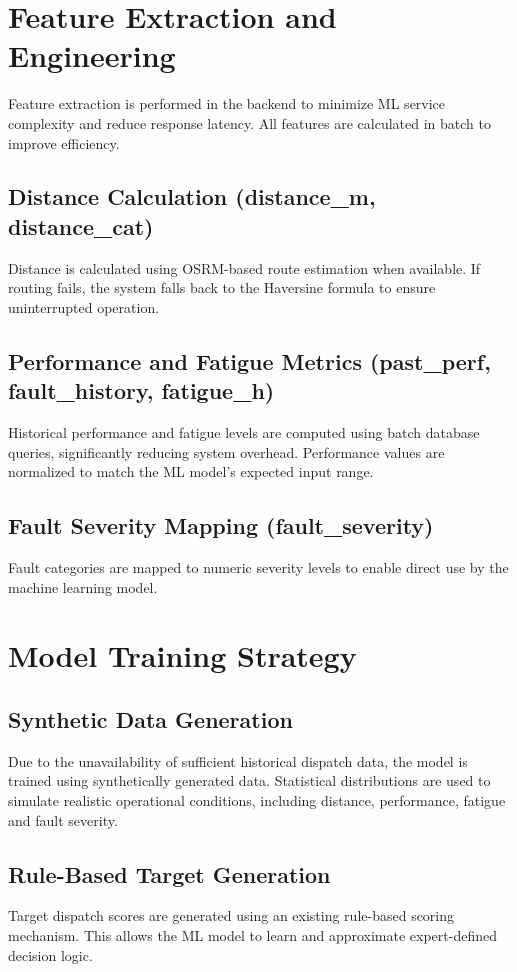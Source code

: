 \section{Feature Extraction and Engineering}
Feature extraction is performed in the backend to minimize ML service complexity and reduce response latency. All features are calculated in batch to improve efficiency.

\subsection{Distance Calculation (distance\_m, distance\_cat)}
Distance is calculated using OSRM-based route estimation when available. If routing fails, the system falls back to the Haversine formula to ensure uninterrupted operation.

\subsection{Performance and Fatigue Metrics (past\_perf, fault\_history, fatigue\_h)}
Historical performance and fatigue levels are computed using batch database queries, significantly reducing system overhead. Performance values are normalized to match the ML model’s expected input range.

\subsection{Fault Severity Mapping (fault\_severity)}
Fault categories are mapped to numeric severity levels to enable direct use by the machine learning model.

\section{Model Training Strategy}

\subsection{Synthetic Data Generation}
Due to the unavailability of sufficient historical dispatch data, the model is trained using synthetically generated data. Statistical distributions are used to simulate realistic operational conditions, including distance, performance, fatigue and fault severity.

\subsection{Rule-Based Target Generation}
Target dispatch scores are generated using an existing rule-based scoring mechanism. This allows the ML model to learn and approximate expert-defined decision logic.

